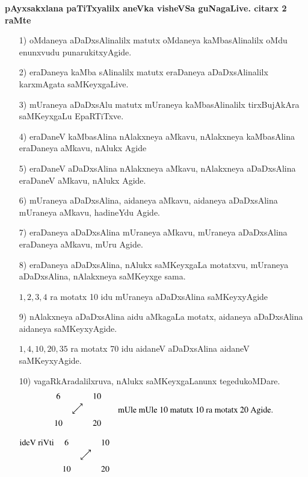 \noindent
\textbf{pAyxsakxlana paTiTxyalilx aneVka visheVSa guNagaLive. citarx {\rm 2} raMte}
\begin{enumerate}
\item[{\rm 1)}] oMdaneya aDaDxsAlinalilx matutx oMdaneya kaMbasAlinalilx oMdu enunxvudu punarukitxyAgide.

\item[{\rm 2)}] eraDaneya kaMba sAlinalilx matutx eraDaneya aDaDxsAlinalilx karxmAgata saMKeyxgaLive.

\item[{\rm 3)}] mUraneya aDaDxsAlu matutx mUraneya kaMbasAlinalilx tirxBujAkAra saMKeyxgaLu EpaRTiTxve.

\item[{\rm 4)}]eraDaneV kaMbasAlina nAlakxneya aMkavu, nAlakxneya kaMbasAlina eraDaneya aMkavu, nAlukx Agide

\item[{\rm 5)}] eraDaneV aDaDxsAlina nAlakxneya aMkavu, nAlakxneya aDaDxsAlina eraDaneV aMkavu, nAlukx Agide.

\item[{\rm 6)}] mUraneya aDaDxsAlina, aidaneya aMkavu, aidaneya aDaDxsAlina mUraneya aMkavu, hadineYdu Agide.

\item[{\rm 7)}] eraDaneya aDaDxsAlina mUraneya aMkavu, mUraneya aDaDxsAlina eraDaneya aMkavu, mUru Agide.

\item[{\rm 8)}] eraDaneya aDaDxsAlina, nAlukx saMKeyxgaLa motatxvu, mUraneya aDaDxsAlina, nAlakxneya saMKeyxge sama.

$1, 2, 3, 4$ ra motatx {\rm 10} idu mUraneya aDaDxsAlina saMKeyxyAgide

\item[{\rm 9)}] nAlakxneya aDaDxsAlina aidu aMkagaLa motatx, aidaneya aDaDxsAlina aidaneya saMKeyxyAgide.

$1, 4, 10, 20, 35$ ra motatx {\rm 70} idu aidaneV aDaDxsAlina aidaneV saMKeyxyAgide.

\item[{\rm 10)}]  vagaRkAradalilxruva, nAlukx saMKeyxgaLanunx tegedukoMDare. 
$$
\begin{matrix}
6 && 10\\
& \rotatebox{45}{$\longleftrightarrow$} & \\
10 && 20
\end{matrix}
\qquad \text{mUle mUle {\rm 10} matutx {\rm 10} ra motatx {\rm 20} Agide.}
$$
\begin{center}
$\begin{matrix}
\text{ideV riVti} & 6 && 10\\
&& \rotatebox{45}{$\longleftrightarrow$} & \\
& 10 && 20
\end{matrix}$
\quad {}\\[-0.55cm]
\end{center}


\end{enumerate}
